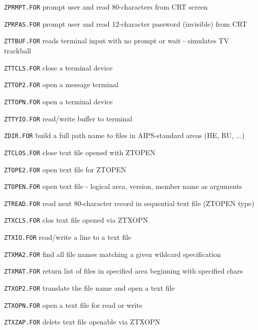 {\medskip

\item{\tt ZPRMPT.FOR} prompt user and read 80-characters from CRT screen
\item{\tt ZPRPAS.FOR} prompt user and read 12-character password (invisible) from CRT
\item{\tt ZTTBUF.FOR} reads terminal input with no prompt or wait - simulates TV trackball
\item{\tt ZTTCLS.FOR} close a terminal device
\item{\tt ZTTOP2.FOR} open a message terminal
\item{\tt ZTTOPN.FOR} open a terminal device
\item{\tt ZTTYIO.FOR} read/write buffer to terminal

\medskip

\item{\tt ZDIR.FOR} build a full path name to files in AIPS-standard areas (HE, RU, $\dots$)
\item{\tt ZTCLOS.FOR} close text file opened with ZTOPEN
\item{\tt ZTOPE2.FOR} open text file for ZTOPEN
\item{\tt ZTOPEN.FOR} open text file - logical area, version, member name as arguments
\item{\tt ZTREAD.FOR} read next 80-character record in sequential text file (ZTOPEN type)
\item{\tt ZTXCLS.FOR} clos text file opened via ZTXOPN
\item{\tt ZTXIO.FOR} read/write a line to a text file
\item{\tt ZTXMA2.FOR} find all file names matching a given wildcard specification
\item{\tt ZTXMAT.FOR} return list of files in specified area beginning with specified chars
\item{\tt ZTXOP2.FOR} translate the file name and open a text file
\item{\tt ZTXOPN.FOR} open a text file for read or write
\item{\tt ZTXZAP.FOR} delete text file openable via ZTXOPN

\medskip

}
